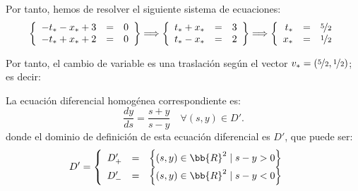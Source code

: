\documentclass[12pt]{article}
\begin{document}
\begin{ejercicio}
    Por tanto, hemos de resolver el siguiente sistema de ecuaciones:
    \begin{equation*}
        \left\{
            \begin{array}{rcl}
                -t_\ast -x_\ast + 3 & = & 0\\
                -t_\ast + x_\ast + 2 & = & 0
            \end{array}
        \right\}
        \Longrightarrow
        \left\{
            \begin{array}{rcl}
                t_\ast +x_\ast& = & 3\\
                t_\ast - x_\ast& = & 2
            \end{array}
        \right\}
        \Longrightarrow
        \left\{
            \begin{array}{rcl}
                t_\ast& = & \nicefrac{5}{2}\\
                x_\ast& = & \nicefrac{1}{2}
            \end{array}
        \right.
    \end{equation*}

    Por tanto, el cambio de variable es una traslación según el vector $v_\ast = \left(\nicefrac{5}{2}, \nicefrac{1}{2}\right)$; es decir:

    La ecuación diferencial homogénea correspondiente es:
    \begin{equation*}
        \dfrac{dy}{ds} = \dfrac{s+y}{s-y} \quad \forall (s,y)\in D'.
    \end{equation*}
    donde el dominio de definición de esta ecuación diferencial es $D'$, que puede ser:
    \begin{align*}
        D' &= \left\{\begin{array}{rcl}
            D_+' & = & \left\{(s,y)\in \bb{R}^2 \mid s-y>0\right\}\\
            D_-' & = & \left\{(s,y)\in \bb{R}^2 \mid s-y<0\right\}
        \end{array}\right.
    \end{align*}
\end{ejercicio}
\end{document}
